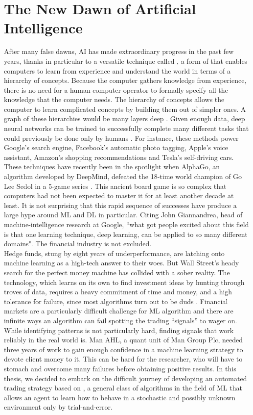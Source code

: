 \section{The New Dawn of Artificial Intelligence}
After many false dawns, \gls{AI} has made extraordinary progress in the past few years, thanks in particular to a versatile technique called , a form of  that enables computers to learn from experience and understand the world in terms of a hierarchy of concepts. Because the computer gathers knowledge from experience, there is no need for a human computer operator to formally specify all the knowledge that the computer needs. The hierarchy of concepts allows the computer to learn complicated concepts by building them out of simpler ones. A graph of these hierarchies would be many layers deep \cite{Goodfellow-et-al-2016-Book}. Given enough data, deep neural networks can be trained to successfully complete many different tasks that could previously be done only by humans \cite{economist2016march}. For instance, these methods power Google's search engine, Facebook's automatic photo tagging, Apple's voice assistant, Amazon's shopping recommendations and Tesla's self-driving cars. These techniques have recently been in the spotlight when AlphaGo, an algorithm developed by DeepMind, defeated the 18-time world champion of Go Lee Sedol in a 5-game series \cite{silver2016mastering}. This ancient board game is so complex that computers had not been expected to master it for at least another decade at least. It is not surprising that this rapid sequence of successes have produce a large hype around \gls{ML} and \gls{DL} in particular. Citing John Giannandrea, head of machine-intelligence research at Google, ``what got people excited about this field is that one learning technique, deep learning, can be applied to so many different domains". The financial industry is not excluded.\\
Hedge funds, stung by eight years of underperformance, are latching onto machine learning as a high-tech answer to their woes. But Wall Street’s heady search for the perfect money machine has collided with a sober reality. The technology, which learns on its own to find investment ideas by hunting through troves of data, requires a heavy commitment of time and money, and a high tolerance for failure, since most algorithms turn out to be duds \cite{bloomberg2016ml}. Financial markets are a particularly difficult challenge for \gls{ML} algorithm and there are infinite ways an algorithm can fail spotting the trading ``signals'' to wager on. While identifying patterns is not particularly hard, finding signals that work reliably in the real world is. Man AHL, a quant unit of Man Group Plc, needed three years of work to gain enough confidence in a machine learning strategy to devote client money to it. This can be hard for the researcher, who will have to stomach and overcome many failures before obtaining positive results. In this thesis, we decided to embark on the difficult journey of developing an automated trading strategy based on , a general class of algorithms in the field of \gls{ML} that allows an agent to learn how to behave in a stochastic and possibly unknown environment only by trial-and-error.

